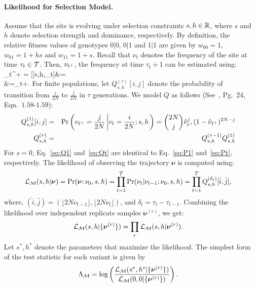 \documentclass[11pt]{article}
\begin{document}
\paragraph{Likelihood for Selection Model.}
Assume that the site is evolving under selection constraints $s,h\in
{\mathbb R}$, where $s$ and $h$ denote selection strength and dominance,
respectively. By definition, the relative fitness values of genotypes
0$|$0, 0$|$1 and 1$|$1 are given by $w_{00}=1$, $w_{01}=1+hs$ and
$w_{11}=1+s$. Recall that $\nu_t$ denotes the frequency of the site at
time $\tau_t\in {\cal T}$. Then, $\nu_{t^+}$, the frequency at time
$\tau_t+1$ can be estimated using: \beq \hat{\nu}_{t^+} =
[\nusp|s,h,\nu_t]&=\\
&=\nu_t+.
  \label{eq:transition}
\eeq
For finite populations, let $Q^{(\tau)}_{s,h}[i,j]$ denote the
probability of transition from $\frac{i}{2N}$ to $\frac{j}{2N}$ in
$\tau$ generations. We model $Q$ as follows
(See~\cite{Ewens2012Mathematical}, Pg.~24, Eqn.~$1.58$-$1.59$):
\begin{eqnarray}
  Q^{(1)}_{s,h}[i,j] &=& \operatorname{Pr}\left(\nu_{t^+}=\frac{j}{2N} \left\lvert
      \nu_{t}=\frac{i}{2N};s,h \right .\right)={2N \choose j}
  \hat{\nu}_{t^+}^{j} (1-\hat{\nu}_{t^+})^{2N-j}\label{eq:Q1}\\
  Q^{(\tau)}_{s,h} &=& Q^{(\tau-1)}_{s,h}Q^{(1)}_{s,h}\label{eq:Qt}
  \label{eq:mkvs}   
\end{eqnarray}
For $s=0$, Eq.~\ref{eq:Q1} and~\ref{eq:Qt} are identical to
Eq.~\ref{eq:P1} and~\ref{eq:Pt}, respectively.  The likelihood of
observing the trajectory $\bm{\nu}$ is computed using:
\begin{equation}
  {\cal L}_{\cal M}(s,h|\bm{\nu}) = \operatorname{Pr}(\bm{\nu};\nu_0,s,h)=
  \prod_{t=1}^{T} \operatorname{Pr}(\nu_{t}|\nu_{t-1};\nu_0,s,h) = \prod_{t=1}^{T} Q^{(\delta_t)}_{s,h}[\hat{i},\hat{j}],
\end{equation}
where, $(\hat{i},\hat{j})=(\lfloor 2N\nu_{t-1}\rfloor, \lfloor
2N\nu_{t}\rfloor)$, and $\delta_t=\tau_{t}-\tau_{t-1}$. Combining the
likelihood over independent replicate samples $\bm{\nu}^{(r)}$, we
get:
\begin{equation}
  {\cal L}_{\cal M}(s,h|\{\bm{\nu}^{(r)}\}) = \prod_r   {\cal L}_{\cal M}(s,h|\bm{\nu}^{(r)}).
  \label{eq:mkvlik}
\end{equation}
Let $s^*,h^*$ denote the parameters that maximize the likelihood. The
simplest form of the test statistic for each variant is given by
\begin{eqnarray}
\Lambda_{\cal M}= \log 
\left(\frac{{\cal L}_{\cal M}(s^*,h^*|\{\bm{\nu}^{(r)}\})}{{\cal L}_{\cal M}(0,0|\{\bm{\nu}^{(r)}\})}\right).
\label{eq:mcts}
\end{eqnarray}
\end{document}
